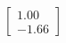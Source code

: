 \documentclass[preview]{standalone}
\begin{document}
\begin{align*}
\begin{bmatrix} 1.00 \\ -1.66 \end{bmatrix}
\end{align*}
\end{document}
